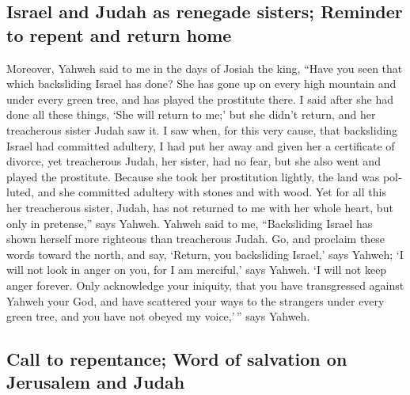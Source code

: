 \begin{paracol}{2}
\begin{otherlanguage}{english}
\hypertarget{israel-and-judah-as-renegade-sisters-reminder-to-repent-and-return-home}{%
\subsection{Israel and Judah as renegade sisters; Reminder to repent and
return
home}\label{israel-and-judah-as-renegade-sisters-reminder-to-repent-and-return-home}}

 Moreover, Yahweh said to me in the days of Josiah the
king, ``Have you seen that which backsliding Israel has done? She has
gone up on every high mountain and under every green tree, and has
played the prostitute there.  I said after she had done
all these things, `She will return to me;' but she didn't return, and
her treacherous sister Judah saw it.  I saw when, for this
very cause, that backsliding Israel had committed adultery, I had put
her away and given her a certificate of divorce, yet treacherous Judah,
her sister, had no fear, but she also went and played the prostitute.
 Because she took her prostitution lightly, the land was
polluted, and she committed adultery with stones and with wood.
 Yet for all this her treacherous sister, Judah, has not
returned to me with her whole heart, but only in pretense,'' says
Yahweh.  Yahweh said to me, ``Backsliding Israel has
shown herself more righteous than treacherous Judah.  Go,
and proclaim these words toward the north, and say, `Return, you
backsliding Israel,' says Yahweh; `I will not look in anger on you, for
I am merciful,' says Yahweh. `I will not keep anger forever.
 Only acknowledge your iniquity, that you have
transgressed against Yahweh your God, and have scattered your ways to
the strangers under every green tree, and you have not obeyed my
voice,'\,'' says Yahweh.

\hypertarget{call-to-repentance-word-of-salvation-on-jerusalem-and-judah}{%
\subsection{Call to repentance; Word of salvation on Jerusalem and
Judah}\label{call-to-repentance-word-of-salvation-on-jerusalem-and-judah}}


\end{otherlanguage}
\end{paracol}
